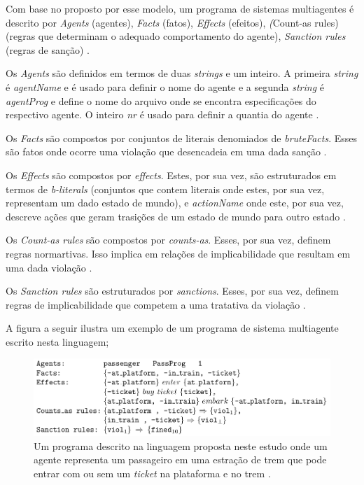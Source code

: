 \documentclass[12pt]{article}
\begin{document}
Com base no proposto por esse modelo, um programa de sistemas multiagentes é descrito por \textit{Agents} (agentes), \textit{Facts} (fatos), \textit{Effects} (efeitos), \textit(Count-as rules) (regras que determinam o adequado comportamento do agente), \textit{Sanction rules} (regras de sanção) \cite{dastaniNormativeMultiAgentProgram}. 

Os \textit{Agents} são definidos em termos de duas \textit{strings} e um inteiro. A primeira \textit{string} é \textit{agentName} e é usado para definir o nome do agente e a segunda \textit{string} é \textit{agentProg} e define o nome  do arquivo onde se encontra especificações do respectivo agente. O inteiro \textit{nr} é usado para definir a quantia do agente \cite{dastaniNormativeMultiAgentProgram}.

Os \textit{Facts} são compostos por conjuntos de literais denomiados de \textit{bruteFacts}. Esses são fatos onde ocorre uma violação que desencadeia em uma dada sanção \cite{dastaniNormativeMultiAgentProgram}. 

Os \textit{Effects} são compostos por \textit{effects}. Estes, por sua vez, são estruturados em termos de \textit{b-literals} (conjuntos que contem literais onde estes, por sua vez, representam um dado estado de mundo), e \textit{actionName} onde este, por sua vez, descreve ações que geram trasições de um estado de mundo para outro estado \cite{dastaniNormativeMultiAgentProgram}. 

Os \textit{Count-as rules} são compostos por \textit{counts-as}. Esses, por sua vez, definem regras normartivas. Isso implica em relações de implicabilidade que resultam em uma dada violação \cite{dastaniNormativeMultiAgentProgram}. 

Os \textit{Sanction rules} são estruturados por \textit{sanctions}. Esses, por sua vez, definem regras de implicabilidade que competem a uma tratativa da violação \cite{dastaniNormativeMultiAgentProgram}.
 
A figura a seguir ilustra um exemplo de um programa de sistema multiagente escrito nesta linguagem;


\begin{figure}[H]
  \centering
  \includegraphics[width=0.8\linewidth]{programdastani.png} 
  \caption{Um programa descrito na linguagem proposta neste estudo onde um agente representa um passageiro em uma estração de trem que pode entrar com ou sem um \textit{ticket} na plataforma e no trem \cite{dastaniNormativeMultiAgentProgram}.}
  \label{exemploprograma}
\end{figure}
\end{document}
